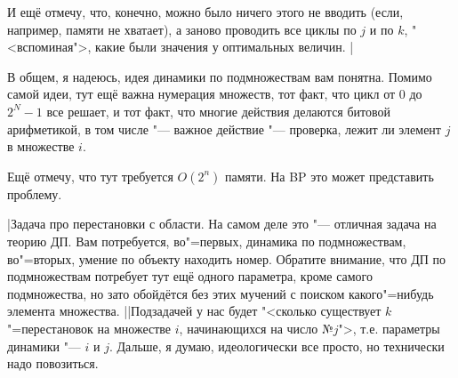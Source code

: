 И ещё отмечу, что, конечно, можно было ничего этого не вводить (если, например, памяти не хватает), 
а заново проводить все циклы по $j$ и по $k$, "<вспоминая">, какие были значения у оптимальных 
величин.
|

В общем, я надеюсь, идея динамики по подмножествам вам понятна. Помимо самой идеи, тут ещё важна
нумерация множеств, тот факт, что цикл от $0$ до $2^N-1$ все решает, и тот факт, что многие действия
делаются битовой арифметикой, в том числе "--- важное действие "--- проверка, лежит ли элемент $j$ в множестве $i$.

Ещё отмечу, что тут требуется $O(2^n)$ памяти. На BP это может представить проблему.

\task|Задача про перестановки с области. На самом деле это "--- отличная задача на теорию ДП. Вам потребуется,
во"=первых, динамика по подмножествам, во"=вторых, умение по объекту находить номер. Обратите внимание, что
ДП по подмножествам потребует тут ещё одного параметра, кроме самого подмножества, но зато обойдётся без этих мучений
с поиском какого"=нибудь элемента множества.
||Подзадачей у нас будет "<сколько существует $k$"=перестановок на множестве $i$, начинающихся на число №$j$">, т.е. параметры динамики "--- $i$ и $j$. Дальше, я думаю, идеологически все просто, но технически надо повозиться.

